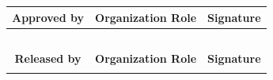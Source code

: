 \begin{center}
\begin{longtable}{|c|c|c|}
    \rowcolor{gray}
    \textbf{Approved by}     &  \textbf{Organization Role}         & \textbf{Signature} \\ \hline
                        &                           &               \\ \hline
                        &                           &               \\ \hline
                        &                           &               \\ \hline
                        &                           &               \\ \hline
                        &                           &               \\ \hline
    \rowcolor{gray}
    \textbf{Released by}     &  \textbf{Organization Role}         & \textbf{Signature} \\ \hline
                       &                           &               \\ \hline
\end{longtable}

\end{center}